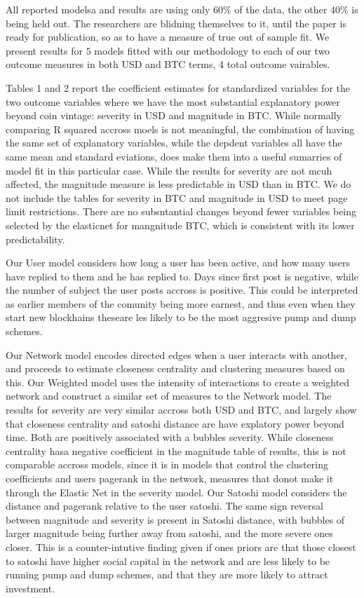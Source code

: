 All reported modelsa and results are using only $60\%$ of the data, the other $40\%$ is being held out. The researchers are blidning themselves to it, until the paper is ready for publication, so as to have a measure of true out of sample fit. 
We present results for $5$ models fitted with our methodology to each of our two outcome measures in both USD and BTC terms, 4 total outcome vairables.

Tables 1 and 2 report the coefficient estimates for standardized variables for the two outcome variables where we have the most substantial explanatory power beyond coin vintage: severity in USD and magnitude in BTC. While normally comparing R squared accross moels is not meaningful, the combination of having the same set of explanatory variables, while the depdent variables all have the same mean and standard eviations, does make them into a useful sumarries of model fit in this particular case. 
While the results for severity are not mcuh affected, the magnitude measure is less predictable in USD than in BTC.
We do not include the tables for severity in BTC and magnitude in USD to meet page limit restrictions.
There are no subsntantial changes beyond fewer variables being selected by the elasticnet for mangnitude BTC, which is consistent with its lower predictability.

Our User model considers how long a user has been active, and how many users have replied to them and he has replied to. 
Days since first post is negative, while the number of subject the user posts accross is positive. This could be interpreted as earlier members of the comunity being more earnest, and thus even when they start new blockhains theseare les likely to be the most aggresive pump and dump schemes. 

Our Network model encodes directed edges when a user interacts with another, and proceeds to estimate closeness centrality and clustering measures based on this. 
Our Weighted model uses the intensity of interactions to create a weighted network and construct a similar set of measures to the Network model.
The results for severity are very similar accross both USD and BTC, and largely show that closeness centrality and satoshi distance are have explatory power beyond time. Both  are positively associated with a bubbles severity.
While closeness centrality hasa negative coefficient in the magnitude table of results, this is not comparable accross models, since it is in models that control the clustering coefficients and users pagerank in the network, measures that donot make it through the Elastic Net in the severity model. 
Our Satoshi model considers the distance and pagerank relative to the user satoshi.
The same sign reversal between magnitude and severity is present in Satoshi distance, with bubbles of larger magnitude being further away from satoshi, and the more severe ones closer.
This is a counter-intutive finding given if ones priors are that those closest to satoshi have higher social capital in the network and are less likely to be running pump and dump schemes, and that they are more likely to attract investment. 

